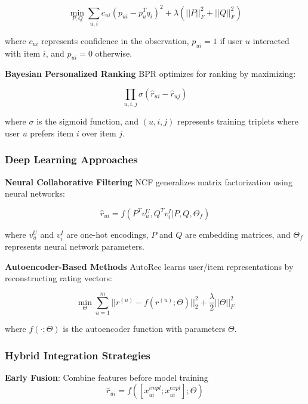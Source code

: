 \begin{equation}
\min_{P,Q} \sum_{u,i} c_{ui}(p_{ui} - p_u^T q_i)^2 + \lambda(||P||_F^2 + ||Q||_F^2)
\end{equation}

where $c_{ui}$ represents confidence in the observation, $p_{ui} = 1$ if user $u$ interacted with item $i$, and $p_{ui} = 0$ otherwise.

\textbf{Bayesian Personalized Ranking}
BPR optimizes for ranking by maximizing:

\begin{equation}
\prod_{u,i,j} \sigma(\hat{r}_{ui} - \hat{r}_{uj})
\end{equation}

where $\sigma$ is the sigmoid function, and $(u,i,j)$ represents training triplets where user $u$ prefers item $i$ over item $j$.

\subsubsection{Deep Learning Approaches}

\textbf{Neural Collaborative Filtering}
NCF generalizes matrix factorization using neural networks:

\begin{equation}
\hat{r}_{ui} = f(P^T v_u^U, Q^T v_i^I | P, Q, \Theta_f)
\end{equation}

where $v_u^U$ and $v_i^I$ are one-hot encodings, $P$ and $Q$ are embedding matrices, and $\Theta_f$ represents neural network parameters.

\textbf{Autoencoder-Based Methods}
AutoRec learns user/item representations by reconstructing rating vectors:

\begin{equation}
\min_{\Theta} \sum_{u=1}^m ||r^{(u)} - f(r^{(u)}; \Theta)||_2^2 + \frac{\lambda}{2}||\Theta||_F^2
\end{equation}

where $f(\cdot; \Theta)$ is the autoencoder function with parameters $\Theta$.

\subsubsection{Hybrid Integration Strategies}

\textbf{Early Fusion}: Combine features before model training
\begin{equation}
\hat{r}_{ui} = f([x_{ui}^{impl}; x_{ui}^{expl}]; \Theta)
\end{equation}

